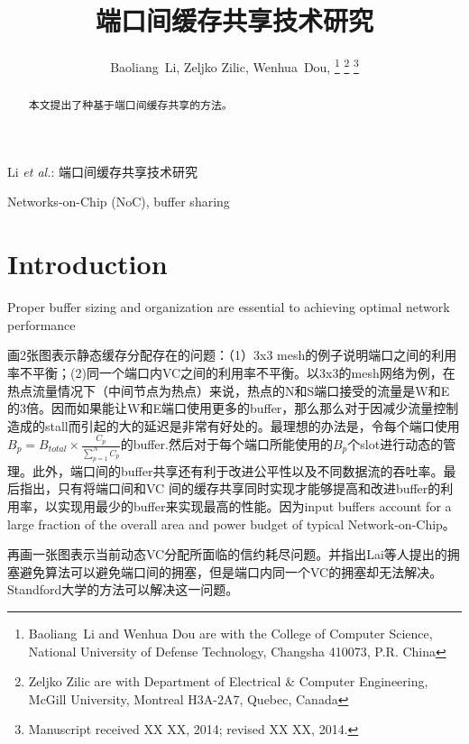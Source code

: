 \documentclass[10pt,journal]{IEEEtran}
\begin{document}
\title{端口间缓存共享技术研究}

\author{Baoliang~Li, %
        Zeljko Zilic, %
        Wenhua~Dou, %
\thanks{Baoliang~Li and Wenhua Dou are with the College of Computer Science, National University of Defense Technology, Changsha 410073, P.R. China}%
\thanks{Zeljko Zilic are with Department of Electrical \& Computer Engineering, McGill University, Montreal H3A-2A7, Quebec, Canada}%
\thanks{Manuscript received XX XX, 2014; revised XX XX, 2014.}}

%
{Li \MakeLowercase{\textit{et al.}}: 端口间缓存共享技术研究}

\maketitle

\begin{abstract}
本文提出了种基于端口间缓存共享的方法。
\end{abstract}
\begin{IEEEkeywords}
Networks-on-Chip (NoC), buffer sharing
\end{IEEEkeywords}

\section{Introduction}
Proper buffer sizing and organization are essential to achieving optimal network performance

画2张图表示静态缓存分配存在的问题：（1）3x3 mesh的例子说明端口之间的利用率不平衡；(2)同一个端口内VC之间的利用率不平衡。以3x3的mesh网络为例，在热点流量情况下（中间节点为热点）来说，热点的N和S端口接受的流量是W和E的3倍。因而如果能让W和E端口使用更多的buffer，那么那么对于因减少流量控制造成的stall而引起的大的延迟是非常有好处的。最理想的办法是，令每个端口使用$B_p=B_{total}\times\frac{C_p}{\sum_{p=1}^NC_p}$的buffer.然后对于每个端口所能使用的$B_p$个slot进行动态的管理。此外，端口间的buffer共享还有利于改进公平性以及不同数据流的吞吐率。最后指出，只有将端口间和VC 间的缓存共享同时实现才能够提高和改进buffer的利用率，以实现用最少的buffer来实现最高的性能。因为input buffers account for a large fraction of the overall area and power budget of typical Network-on-Chip。

再画一张图表示当前动态VC分配所面临的信约耗尽问题。并指出Lai等人提出的拥塞避免算法可以避免端口间的拥塞，但是端口内同一个VC的拥塞却无法解决。Standford大学的方法可以解决这一问题。
\end{document}
